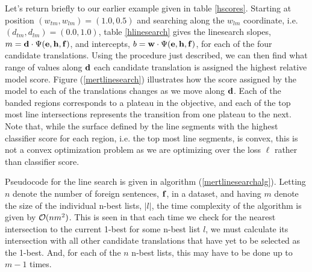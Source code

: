 \documentclass[11pt]{article}
\begin{document}
Let's return briefly to our earlier example given in table \ref{hscores}. Starting at position \mbox{$(w_{tm}, w_{lm}) = (1.0, 0.5)$} and searching along the \mbox{$w_{lm}$} coordinate, i.e. \mbox{$(d_{tm}, d_{lm}) = (0.0, 1.0)$}, table \ref{hlinesearch} gives the linesearch slopes, \mbox{$m = {\bf d} \cdot \Psi({\bf e}, {\bf h}, {\bf f})$}, and intercepts, \mbox{$b = {\bf w} \cdot \Psi({\bf e}, {\bf h}, {\bf f})$}, for each of the four candidate translations. Using the procedure just described, we can then find what range of values along \mbox{${\bf d}$} each candidate translation is assigned the highest relative model score.  Figure (\ref{mertlinesearch}) illustrates how the score assigned by the model to each of the translations changes as we move along \mbox{${\bf d}$}. Each of the banded regions corresponds to a plateau in the objective, and each of the top most line intersections represents the transition from one plateau to the next. Note that, while the surface defined by the line segments with the highest classifier score for each region, i.e\@. the top most line segments, is convex, this is not a convex optimization problem as we are optimizing over the loss $\ell$ rather than classifier score. 

Pseudocode for the line search is given in algorithm (\ref{mertlinesearchalg}). Letting \mbox{$n$} denote the number of foreign sentences, \mbox{${\bf f}$}, in a dataset, and having \mbox{$m$} denote the size of the individual n-best lists, \mbox{$|l|$}, the time complexity of the algorithm is given by \mbox{${\cal O}(n m^2)$}. This is seen in that each time we check for the nearest intersection to the current 1-best for some n-best list \mbox{$l$}, we must calculate its intersection with all other candidate translations that have yet to be selected as the 1-best. And, for each of the \mbox{$n$} n-best lists, this may have to be done up to \mbox{$m-1$} times. 
\end{document}
